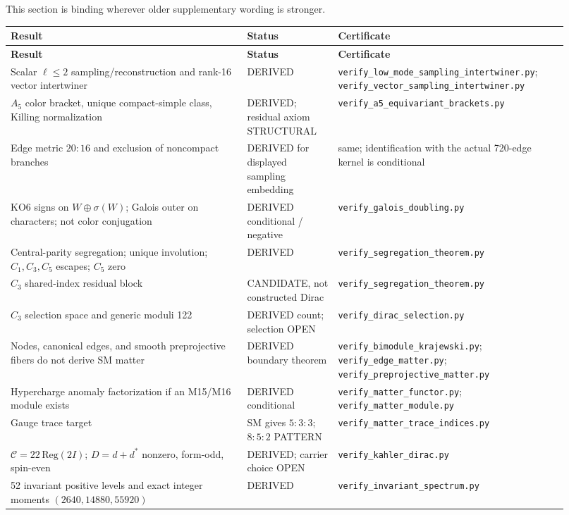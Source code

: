 \documentclass[12pt,a4paper]{article}
\theoremstyle{definition}
\begin{document}
This section is binding wherever older supplementary wording is stronger.
\begin{longtable}{p{0.39\linewidth}p{0.15\linewidth}p{0.38\linewidth}}
\toprule
\textbf{Result} & \textbf{Status} & \textbf{Certificate}\\
\midrule
\endfirsthead
\toprule
\textbf{Result} & \textbf{Status} & \textbf{Certificate}\\
\midrule
\endhead
Scalar $\ell\le2$ sampling/reconstruction and rank-16 vector intertwiner & DERIVED & \texttt{verify\_low\_mode\_sampling\_intertwiner.py}; \texttt{verify\_vector\_sampling\_intertwiner.py}\\
$A_5$ color bracket, unique compact-simple class, Killing normalization & DERIVED; residual axiom STRUCTURAL & \texttt{verify\_a5\_equivariant\_brackets.py}\\
Edge metric $20:16$ and exclusion of noncompact branches & DERIVED for displayed sampling embedding & same; identification with the actual 720-edge kernel is conditional\\
KO6 signs on $W\oplus\sigma(W)$; Galois outer on characters; not color conjugation & DERIVED conditional / negative & \texttt{verify\_galois\_doubling.py}\\
Central-parity segregation; unique involution; $C_1,C_3,C_5$ escapes; $C_5$ zero & DERIVED & \texttt{verify\_segregation\_theorem.py}\\
$C_3$ shared-index residual block & CANDIDATE, not constructed Dirac & \texttt{verify\_segregation\_theorem.py}\\
$C_3$ selection space and generic moduli 122 & DERIVED count; selection OPEN & \texttt{verify\_dirac\_selection.py}\\
Nodes, canonical edges, and smooth preprojective fibers do not derive SM matter & DERIVED boundary theorem & \texttt{verify\_bimodule\_krajewski.py}; \texttt{verify\_edge\_matter.py}; \texttt{verify\_preprojective\_matter.py}\\
Hypercharge anomaly factorization if an M15/M16 module exists & DERIVED conditional & \texttt{verify\_matter\_functor.py}; \texttt{verify\_matter\_module.py}\\
Gauge trace target & SM gives $5:3:3$; $8:5:2$ PATTERN & \texttt{verify\_matter\_trace\_indices.py}\\
$\mathcal C=22\,\mathrm{Reg}(2I)$; $D=d+d^*$ nonzero, form-odd, spin-even & DERIVED; carrier choice OPEN & \texttt{verify\_kahler\_dirac.py}\\
52 invariant positive levels and exact integer moments $(2640,14880,55920)$ & DERIVED & \texttt{verify\_invariant\_spectrum.py}\\

\end{longtable}
\end{document}
